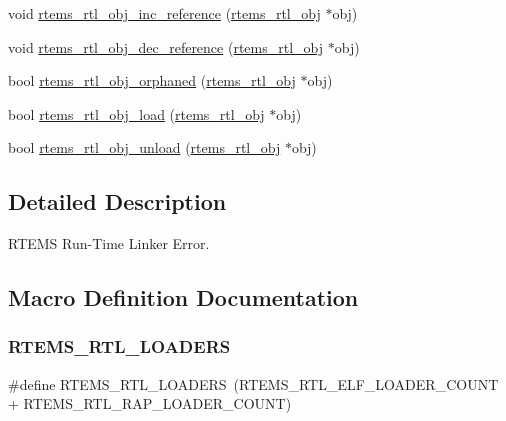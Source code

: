 \begin{DoxyCompactItemize}
\item 
void \mbox{\hyperlink{rtl-obj_8c_a86116ffbe87cb58f2428e6c66e4db58e}{rtems\+\_\+rtl\+\_\+obj\+\_\+inc\+\_\+reference}} (\mbox{\hyperlink{structrtems__rtl__obj}{rtems\+\_\+rtl\+\_\+obj}} $\ast$obj)
\item 
void \mbox{\hyperlink{rtl-obj_8c_a77c0042ad0312c5043e9d8259171e6f5}{rtems\+\_\+rtl\+\_\+obj\+\_\+dec\+\_\+reference}} (\mbox{\hyperlink{structrtems__rtl__obj}{rtems\+\_\+rtl\+\_\+obj}} $\ast$obj)
\item 
bool \mbox{\hyperlink{rtl-obj_8c_af86dc76c1597801ece0edbe4d91a0ee8}{rtems\+\_\+rtl\+\_\+obj\+\_\+orphaned}} (\mbox{\hyperlink{structrtems__rtl__obj}{rtems\+\_\+rtl\+\_\+obj}} $\ast$obj)
\item 
bool \mbox{\hyperlink{rtl-obj_8c_a35de063bbe9cf53cc23ee71a3069e641}{rtems\+\_\+rtl\+\_\+obj\+\_\+load}} (\mbox{\hyperlink{structrtems__rtl__obj}{rtems\+\_\+rtl\+\_\+obj}} $\ast$obj)
\item 
bool \mbox{\hyperlink{rtl-obj_8c_a8c0debf8dbf88e9eac3f24357473b1bc}{rtems\+\_\+rtl\+\_\+obj\+\_\+unload}} (\mbox{\hyperlink{structrtems__rtl__obj}{rtems\+\_\+rtl\+\_\+obj}} $\ast$obj)
\end{DoxyCompactItemize}


\subsection{Detailed Description}
R\+T\+E\+MS Run-\/\+Time Linker Error. 



\subsection{Macro Definition Documentation}
\mbox{\label{rtl-obj_8c_a3e57f4e8e49945981608f26243b642c7}} 
\subsubsection{\texorpdfstring{RTEMS\_RTL\_LOADERS}{RTEMS\_RTL\_LOADERS}}
{\footnotesize\ttfamily \#define R\+T\+E\+M\+S\+\_\+\+R\+T\+L\+\_\+\+L\+O\+A\+D\+E\+RS~(R\+T\+E\+M\+S\+\_\+\+R\+T\+L\+\_\+\+E\+L\+F\+\_\+\+L\+O\+A\+D\+E\+R\+\_\+\+C\+O\+U\+NT + R\+T\+E\+M\+S\+\_\+\+R\+T\+L\+\_\+\+R\+A\+P\+\_\+\+L\+O\+A\+D\+E\+R\+\_\+\+C\+O\+U\+NT)}

